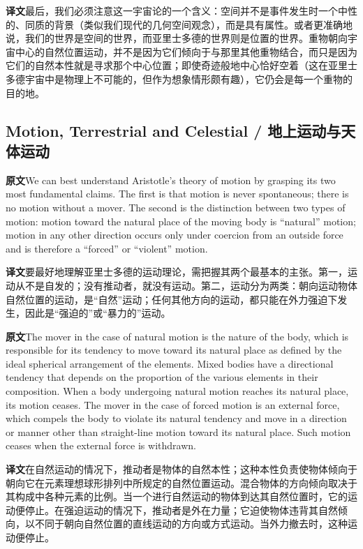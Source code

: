 \documentclass[UTF8,zihao=-4]{ctexart}
\newcommand{\BodyFont}{\fontsize{10.5pt}{15.5pt}\selectfont}
\newcommand{\origlabel}{\textbf{原文}\quad}
\newcommand{\translabel}{\textbf{译文}\quad}
\newcommand{\orig}{\par\noindent\begingroup\BodyFont\origlabel}
\newcommand{\zhline}[1]{\par\endgroup\noindent\begingroup\BodyFont\translabel #1\par\endgroup\vspace{0.35em}}
\begin{document}
\zhline{最后，我们必须注意这一宇宙论的一个含义：空间并不是事件发生时一个中性的、同质的背景（类似我们现代的几何空间观念），而是具有属性。或者更准确地说，我们的世界是空间的世界，而亚里士多德的世界则是位置的世界。重物朝向宇宙中心的自然位置运动，并不是因为它们倾向于与那里其他重物结合，而只是因为它们的自然本性就是寻求那个中心位置；即使奇迹般地中心恰好空着（这在亚里士多德宇宙中是物理上不可能的，但作为想象情形颇有趣），它仍会是每一个重物的目的地。}

\subsection*{Motion, Terrestrial and Celestial / 地上运动与天体运动}

\orig We can best understand Aristotle's theory of motion by grasping its two most fundamental claims. The first is that motion is never spontaneous; there is no motion without a mover. The second is the distinction between two types of motion: motion toward the natural place of the moving body is ``natural'' motion; motion in any other direction occurs only under coercion from an outside force and is therefore a ``forced'' or ``violent'' motion.

\zhline{要最好地理解亚里士多德的运动理论，需把握其两个最基本的主张。第一，运动从不是自发的；没有推动者，就没有运动。第二，运动分为两类：朝向运动物体自然位置的运动，是“自然”运动；任何其他方向的运动，都只能在外力强迫下发生，因此是“强迫的”或“暴力的”运动。}

\orig The mover in the case of natural motion is the nature of the body, which is responsible for its tendency to move toward its natural place as defined by the ideal spherical arrangement of the elements. Mixed bodies have a directional tendency that depends on the proportion of the various elements in their composition. When a body undergoing natural motion reaches its natural place, its motion ceases. The mover in the case of forced motion is an external force, which compels the body to violate its natural tendency and move in a direction or manner other than straight-line motion toward its natural place. Such motion ceases when the external force is withdrawn.

\zhline{在自然运动的情况下，推动者是物体的自然本性；这种本性负责使物体倾向于朝向它在元素理想球形排列中所规定的自然位置运动。混合物体的方向倾向取决于其构成中各种元素的比例。当一个进行自然运动的物体到达其自然位置时，它的运动便停止。在强迫运动的情况下，推动者是外在力量；它迫使物体违背其自然倾向，以不同于朝向自然位置的直线运动的方向或方式运动。当外力撤去时，这种运动便停止。}
\end{document}
